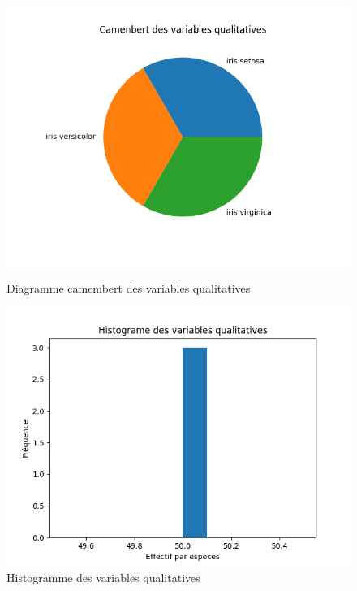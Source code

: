\begin{figure}[!h]
    \centering
    \begin{minipage}{.48\linewidth}
        \begin{center}
            \includegraphics[width=1.1\textwidth]{img/Figure_1.png}
            \caption{\label{fig:camembert}Diagramme camembert des variables qualitatives}  
    \end{center}
    \end{minipage}\hfill
    \begin{minipage}{.48\linewidth}
        \begin{center}
                \includegraphics[width=1.1\textwidth]{img/Figure_2.png}
                \caption{\label{fig:histogramme_var-qualitatives}Histogramme des variables qualitatives}  
        \end{center}
    \end{minipage}
\end{figure}

